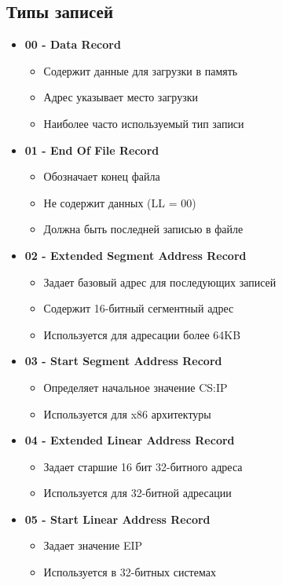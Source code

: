 \documentclass[a4paper, 12pt]{article}
\begin{document}
\subsection{Типы записей}
\begin{itemize}
    \item \textbf{00 - Data Record}
    \begin{itemize}
        \item Содержит данные для загрузки в память
        \item Адрес указывает место загрузки
        \item Наиболее часто используемый тип записи
    \end{itemize}
    \item \textbf{01 - End Of File Record}
    \begin{itemize}
        \item Обозначает конец файла
        \item Не содержит данных (LL = 00)
        \item Должна быть последней записью в файле
    \end{itemize}
    \item \textbf{02 - Extended Segment Address Record}
    \begin{itemize}
        \item Задает базовый адрес для последующих записей
        \item Содержит 16-битный сегментный адрес
        \item Используется для адресации более 64KB
    \end{itemize}
    \item \textbf{03 - Start Segment Address Record}
    \begin{itemize}
        \item Определяет начальное значение CS:IP
        \item Используется для x86 архитектуры
    \end{itemize}
    \item \textbf{04 - Extended Linear Address Record}
    \begin{itemize}
        \item Задает старшие 16 бит 32-битного адреса
        \item Используется для 32-битной адресации
    \end{itemize}
    \item \textbf{05 - Start Linear Address Record}
    \begin{itemize}
        \item Задает значение EIP
        \item Используется в 32-битных системах
    \end{itemize}
\end{itemize}
\end{document}
